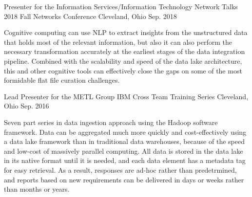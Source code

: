 

\begin{cventries}

  \cventry
    {Presenter for the Information Services/Information Technology Network Talks} %
    {2018 Fall Networks Conference} %
    {Cleveland, Ohio} %
    {Sep. 2018} %
    {
      \begin{cvitems} %
        \item {Cognitive computing can use NLP to extract insights from the unstructured data that holds most of the relevant information, but also it can also perform the necessary transformation accurately at the earliest stages of the data integration pipeline.  Combined with the scalability and speed of the data lake architecture, this and other cognitive tools can effectively close the gaps on some of the most formidable flat file curation challenges.}
      \end{cvitems}
    }

  \cventry
    {Lead Presenter for the METL Group} %
    {IBM Cross Team Training Series} %
    {Cleveland, Ohio} %
    {Sep. 2016} %
    {
      \begin{cvitems} %
        \item {Seven part series in data ingestion approach using the Hadoop software framework.  Data can be aggregated much more quickly and cost-effectively using a data lake framework than in traditional data warehouses, because of the speed and low-cost of massively parallel computing.  All data is stored in the data lake in its native format until it is needed, and each data element has a metadata tag for easy retrieval.  As a result, responses are ad-hoc rather than predetrmined, and reports based on new requirements can be delivered in days or weeks rather than months or years.}
      \end{cvitems}
    }

\end{cventries}
